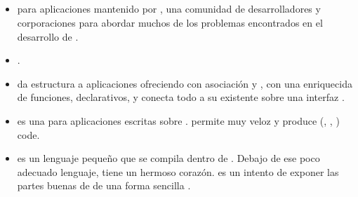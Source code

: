 \subsection{\clientSide}
\begin{itemize}
	\item \textbf{\angularjs} \frameworkPC \openSourcePC para aplicaciones \webINT mantenido por \google, una comunidad de desarrolladores y corporaciones para abordar muchos de los problemas encontrados en el desarrollo de \singlePageApp\cite{technology_angularjs}.
	\item \textbf{\emberjs}\cite{online_technology_emberjs}.
	\item \textbf{\backbonejs} da estructura a aplicaciones \webINT ofreciendo \textbf{\modelsCustom} con asociación \keyValue y \events \custom, \textbf{\collectionsDB} con una \api enriquecida de funciones, \textbf{\views} \handling \event declarativos, y conecta todo a su \api existente sobre una interfaz \json \restful \cite{online_technology_backbone}.
	
	\item \textbf{\meteor} es una \frameworkPC  \openSourcePC \realTimeINT para aplicaciones \webINT \javaScriptNAME escritas sobre \nodejsNAME \cite{online_meteor_documentation}. \meteor permite \prototypingCPT muy veloz \cite{online_meteor_documentation_why} y produce \crossPlatform (\webINT, \android, \ios) code\cite{online_meteor_cross_platform}.
	
	\item \textbf{\coffeescript} es un lenguaje pequeño que se compila dentro de \javaScriptNAME. Debajo de ese poco adecuado lenguaje, \javaScriptNAME tiene un hermoso corazón. \coffeescript es un intento de exponer las partes buenas de \javaScriptNAME de una forma sencilla \cite{technology_coffeescript}.
	
	
	

\end{itemize}
